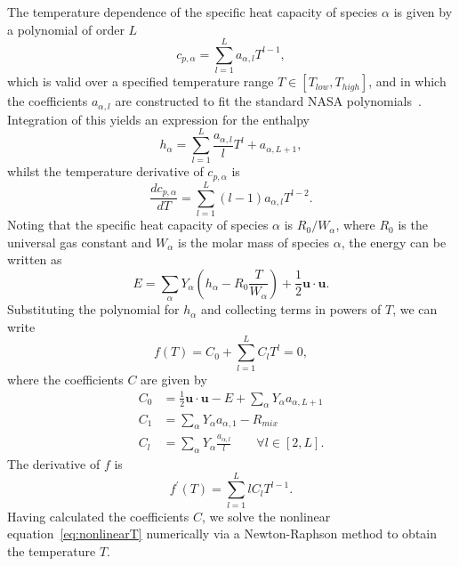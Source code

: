 \documentclass[notitlepage]{revtex4-1}
\begin{document}
The temperature dependence of the specific heat capacity of species $\alpha$ is given by a polynomial of order $L$
\begin{equation}c_{p,\alpha}=\displaystyle\sum_{l=1}^{L}a_{\alpha,l}T^{l-1},\end{equation}
which is valid over a specified temperature range $T\in\left[T_{low},T_{high}\right]$, and in which the coefficients $a_{\alpha,l}$ are constructed to fit the standard NASA polynomials~\cite{gordon_1971}. Integration of this yields an expression for the enthalpy
\begin{equation}h_{\alpha}=\displaystyle\sum_{l=1}^{L}\frac{a_{\alpha,l}}{l}T^{l} + a_{\alpha,L+1},\end{equation}
whilst the temperature derivative of $c_{p,\alpha}$ is
\begin{equation}\frac{dc_{p,\alpha}}{dT}=\displaystyle\sum_{l=1}^{L}\left(l-1\right)a_{\alpha,l}T^{l-2}.\end{equation}
Noting that the specific heat capacity of species $\alpha$ is $R_{0}/W_{\alpha}$, where $R_{0}$ is the universal gas constant and $W_{\alpha}$ is the molar mass of species $\alpha$, the energy can be written as
\begin{equation}E=\displaystyle\sum_{\alpha}Y_{\alpha}\left(h_{\alpha}-R_{0}\frac{T}{W_{\alpha}}\right)+\frac{1}{2}\bm{u}\cdot\bm{u}.\end{equation}
Substituting the polynomial for $h_{\alpha}$ and collecting terms in powers of $T$, we can write
\begin{equation}f\left(T\right)=C_{0}+\displaystyle\sum_{l=1}^{L}C_{l}T^{l}=0,\label{eq:nonlinearT}\end{equation}
where the coefficients $C$ are given by
\begin{subequations}\begin{align}
C_{0}&=\frac{1}{2}\bm{u}\cdot\bm{u}-E+\displaystyle\sum_{\alpha}Y_{\alpha}a_{\alpha,L+1}\\
C_{1}&=\displaystyle\sum_{\alpha}Y_{\alpha}a_{\alpha,1} - R_{mix}\\
C_{l}&=\displaystyle\sum_{\alpha}Y_{\alpha}\frac{a_{\alpha,l}}{l}\qquad\forall{l}\in\left[2,L\right].\end{align}\end{subequations}
The derivative of $f$ is
\begin{equation}f^{\prime}\left(T\right)=\displaystyle\sum_{l=1}^{L}lC_{l}T^{l-1}.\end{equation}
Having calculated the coefficients $C$, we solve the nonlinear equation~\eqref{eq:nonlinearT} numerically via a Newton-Raphson method to obtain the temperature $T$.
\end{document}

